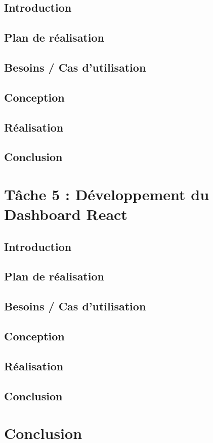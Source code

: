 \subsection*{Introduction}

\subsection*{Plan de réalisation}

\subsection*{Besoins / Cas d'utilisation}

\subsection*{Conception}

\subsection*{Réalisation}

\subsection*{Conclusion}

\section{Tâche 5 : Développement du Dashboard React}

\subsection*{Introduction}

\subsection*{Plan de réalisation}

\subsection*{Besoins / Cas d'utilisation}

\subsection*{Conception}

\subsection*{Réalisation}

\subsection*{Conclusion}

\section*{Conclusion}
